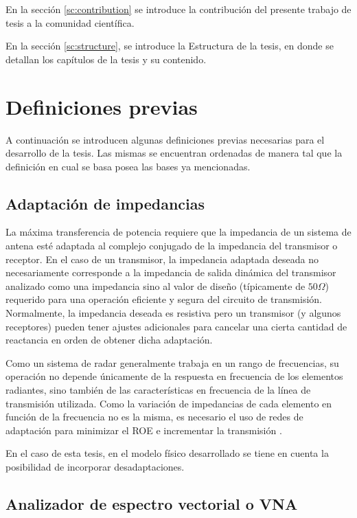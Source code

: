 En la sección \ref{sc:contribution} se introduce la contribución del presente trabajo de tesis a la comunidad científica.

En la sección \ref{sc:structure}, se introduce la Estructura de la tesis, en donde se detallan los capítulos de la tesis y su
contenido.


\section{Definiciones previas} \label{sc:definitions}

A continuación se introducen algunas definiciones previas necesarias para el desarrollo de la tesis. Las mismas se encuentran
ordenadas de manera tal que la definición en cual se basa posea las bases ya mencionadas.


\subsection{Adaptación de impedancias}
La máxima transferencia de potencia requiere que la impedancia de un sistema de antena esté adaptada al complejo conjugado de la
impedancia del transmisor o receptor. En el caso de un transmisor, la impedancia adaptada deseada no necesariamente corresponde a
la impedancia de salida dinámica del transmisor analizado como una impedancia sino al valor de diseño (típicamente de
$50 \Omega$) requerido para una operación eficiente y segura del circuito de transmisión. Normalmente, la impedancia deseada es
resistiva pero un transmisor (y algunos receptores) pueden tener ajustes adicionales para cancelar una cierta cantidad de
reactancia en orden de obtener dicha adaptación.

Como un sistema de radar generalmente trabaja en un rango de frecuencias, su operación no depende únicamente de la respuesta en
frecuencia de los elementos radiantes, sino también de las características en frecuencia de la línea de transmisión utilizada.
Como la variación de impedancias de cada elemento en función de la frecuencia no es la misma, es necesario el uso de redes de
adaptación para minimizar el ROE e incrementar la transmisión \cite{Balanis2012}.

En el caso de esta tesis, en el modelo físico desarrollado se tiene en cuenta la posibilidad de incorporar desadaptaciones.


\subsection{Analizador de espectro vectorial o VNA}


